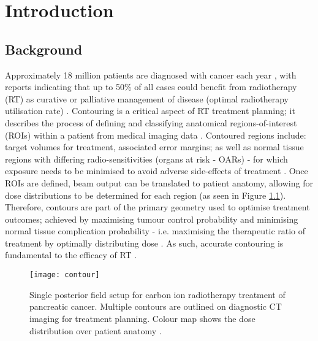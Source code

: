 \chapter{Introduction} \label{ch:introduction}

\section{Background}
Approximately 18 million patients are diagnosed with cancer each year \cite{Bray2019}, with reports indicating that up to 50\% of all cases could benefit from radiotherapy (RT) as curative or palliative management of disease (optimal radiotherapy utilisation rate) \cite{Barton2014}. 
Contouring is a critical aspect of RT treatment planning; it describes the process of defining and classifying anatomical regions-of-interest (ROIs) within a patient from medical imaging data \cite{CITATION}.
Contoured regions include: target volumes for treatment, associated error margins; as well as normal tissue regions with differing radio-sensitivities (organs at risk - OARs) - for which exposure needs to be minimised to avoid adverse side-effects of treatment \cite{CITATION}. Once ROIs are defined, beam output can be translated to patient anatomy, allowing for dose distributions to be determined for each region (as seen in Figure \ref{fig:contour}). Therefore, contours are part of the primary geometry used to optimise treatment outcomes; achieved by maximising tumour control probability and minimising normal tissue complication probability - i.e. maximising the therapeutic ratio of treatment by optimally distributing dose \cite{CITATION}. As such, accurate contouring is fundamental to the efficacy of RT \cite{CITATION}.

\begin{figure}[!htb]
	\begin{center}
		\texttt{[image: contour]}
		\caption{Single posterior field setup for carbon ion radiotherapy treatment of pancreatic cancer. Multiple contours are outlined on diagnostic CT imaging for treatment planning. Colour map shows the dose distribution over patient anatomy \cite{Dreher2017}.}
		\label{fig:contour}
	\end{center}
\end{figure}

